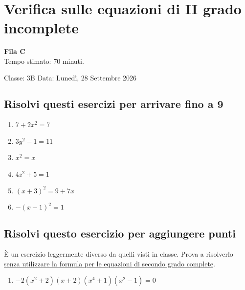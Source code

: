 \documentclass[11pt]{report}
\begin{document}
\chapter*{Verifica sulle equazioni di II grado incomplete}
\begin{flushright}
    \textbf{Fila C}\\
    Tempo stimato: 70 minuti.
\end{flushright}

\begin{flushright}
    Classe: 3B \quad Data: Lunedì, 28 Settembre 2026
\end{flushright} 

\vspace{0.8em}
\regoladoro

\section*{Risolvi questi esercizi per arrivare fino a 9}
\begin{enumerate}
    \item $7+2x^2=7$
    \item $3y^2-1=11$
    \item $x^2=x$
    \item $4z^2+5=1$
    \item $(x+3)^2=9+7x$
    \item $-(x-1)^2=1$
\end{enumerate}
\section*{Risolvi questo esercizio per aggiungere punti}
È un esercizio leggermente diverso da quelli visti in classe. Prova a risolverlo \ul{senza utilizzare la formula per le equazioni di secondo grado complete}.
\begin{enumerate}
    \item[7.] $-2(x^2+2)(x+2)(x^4+1)(x^2-1)=0$ 
\end{enumerate}
\end{document}
